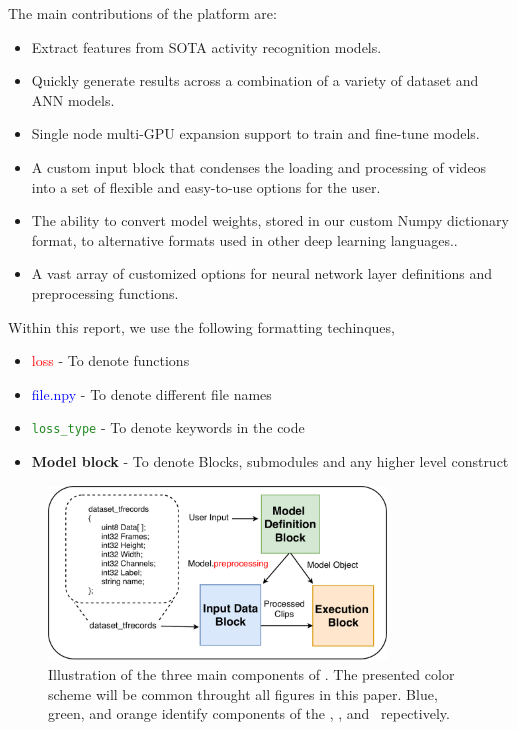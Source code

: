 \documentclass{llncs}
\begin{document}
The main contributions of the platform are:
\begin{itemize}
\item Extract features from SOTA activity recognition models.
\item Quickly generate results across a combination of a variety of dataset and ANN models.
\item Single node multi-GPU expansion support to train and fine-tune models.
\item A custom input block that condenses the loading and processing of videos into a set of flexible and easy-to-use options for the user.
\item The ability to convert model weights, stored in our custom Numpy dictionary format, to alternative formats used in other deep learning languages..
\item A vast array of customized options for neural network layer definitions and preprocessing functions.
\end{itemize}

Within this report, we use the following formatting techinques,
\begin{itemize}
\item \textcolor{red}{loss} - To denote functions
\item \textcolor{blue}{file.npy} - To denote different file names
\item \texttt{\textcolor{ForestGreen}{loss\_type}} - To denote keywords in the code
\item \textbf{Model block} - To denote Blocks, submodules and any higher level construct
\end{itemize}

\begin{figure}[b!]
\centering
\includegraphics[width=0.8\textwidth]{images/overview.pdf}
\caption{Illustration of the three main components of \acro.
The presented color scheme will be common throught all figures in this paper.
Blue, green, and orange identify components of the \data, \model, and \exec~repectively.}
\label{fig:overview}
\end{figure}
\end{document}
